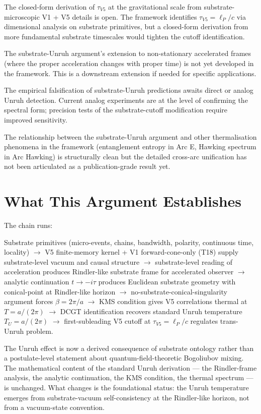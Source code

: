 \documentclass[11pt,a4paper]{article}
\begin{document}
The closed-form derivation of $\tau_{V5}$ at the gravitational scale from substrate-microscopic V1 + V5 details is open. The framework identifies $\tau_{V5} = \ell_P/c$ via dimensional analysis on substrate primitives, but a closed-form derivation from more fundamental substrate timescales would tighten the cutoff identification.

The substrate-Unruh argument's extension to non-stationary accelerated frames (where the proper acceleration changes with proper time) is not yet developed in the framework. This is a downstream extension if needed for specific applications.

The empirical falsification of substrate-Unruh predictions awaits direct or analog Unruh detection. Current analog experiments are at the level of confirming the spectral form; precision tests of the substrate-cutoff modification require improved sensitivity.

The relationship between the substrate-Unruh argument and other thermalisation phenomena in the framework (entanglement entropy in Arc E, Hawking spectrum in Arc Hawking) is structurally clean but the detailed cross-arc unification has not been articulated as a publication-grade result yet.

\section{What This Argument Establishes}

The chain runs:

Substrate primitives (micro-events, chains, bandwidth, polarity, continuous time, locality) $\to$ V5 finite-memory kernel + V1 forward-cone-only (T18) supply substrate-level vacuum and causal structure $\to$ substrate-level reading of acceleration produces Rindler-like substrate frame for accelerated observer $\to$ analytic continuation $t \to -i\tau$ produces Euclidean substrate geometry with conical-point at Rindler-like horizon $\to$ no-substrate-conical-singularity argument forces $\beta = 2\pi/a$ $\to$ KMS condition gives V5 correlations thermal at $T = a/(2\pi)$ $\to$ DCGT identification recovers standard Unruh temperature $T_U = a/(2\pi)$ $\to$ first-subleading V5 cutoff at $\tau_{V5} = \ell_P/c$ regulates trans-Unruh problem.

The Unruh effect is now a derived consequence of substrate ontology rather than a postulate-level statement about quantum-field-theoretic Bogoliubov mixing. The mathematical content of the standard Unruh derivation --- the Rindler-frame analysis, the analytic continuation, the KMS condition, the thermal spectrum --- is unchanged. What changes is the foundational status: the Unruh temperature emerges from substrate-vacuum self-consistency at the Rindler-like horizon, not from a vacuum-state convention.
\end{document}
